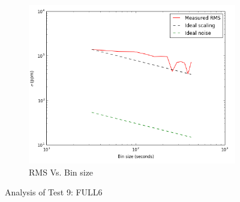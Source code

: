 \documentclass[conference]{IEEEtran}
\begin{document}
\begin{figure}[H]
    \begin{subfigure}{3}
        \includegraphics[scale=0.6]{rms_test9}
        \caption{RMS Vs. Bin size}
    \end{subfigure}
    \caption{Analysis of Test 9: FULL6}
\end{figure}
\end{document}
